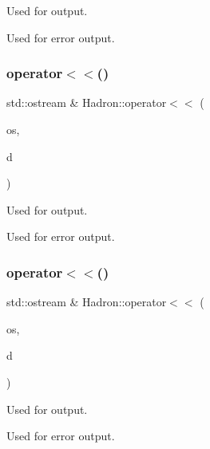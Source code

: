 Used for output. 

Used for error output. \mbox{\label{namespaceHadron_a2559588d0550564638289369a0d3ba30}} 
\subsubsection{\texorpdfstring{operator$<$$<$()}{operator<<()}\hspace{0.1cm}{\footnotesize\ttfamily [5/48]}}
{\footnotesize\ttfamily std\+::ostream \& Hadron\+::operator$<$$<$ (\begin{DoxyParamCaption}\item[{std\+::ostream \&}]{os,  }\item[{const \mbox{\hyperlink{structHadron_1_1KeyHadronSUNNPartNPtCorr__t_1_1NPoint__t}{Key\+Hadron\+S\+U\+N\+N\+Part\+N\+Pt\+Corr\+\_\+t\+::\+N\+Point\+\_\+t}} \&}]{d }\end{DoxyParamCaption})}



Used for output. 

Used for error output. \mbox{\label{namespaceHadron_a8b41635ad70840ac7fc9ebff331876e4}} 
\subsubsection{\texorpdfstring{operator$<$$<$()}{operator<<()}\hspace{0.1cm}{\footnotesize\ttfamily [6/48]}}
{\footnotesize\ttfamily std\+::ostream \& Hadron\+::operator$<$$<$ (\begin{DoxyParamCaption}\item[{std\+::ostream \&}]{os,  }\item[{const \mbox{\hyperlink{structHadron_1_1KeyHadronNPartIrrep__t}{Key\+Hadron\+N\+Part\+Irrep\+\_\+t}} \&}]{d }\end{DoxyParamCaption})}



Used for output. 

Used for error output. \mbox{\label{namespaceHadron_aa96f2bb0448730889b5e59a58a1a62dd}} 
